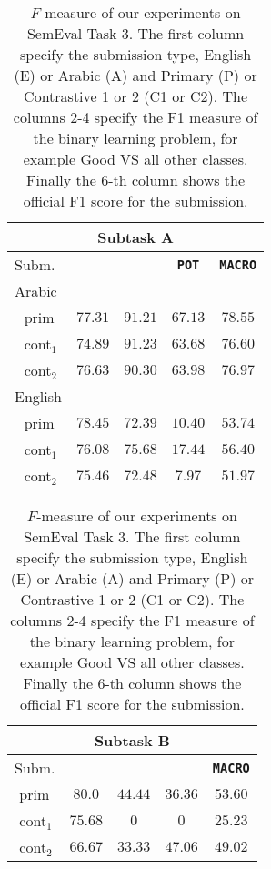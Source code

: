   \begin{table}[h]
 \begin{tabular}{|l|cccc|}
  \multicolumn{5}{c}{Subtask A} \\
  \hline
 Subm.		& \bf \good & \bf\bad 	& \bf \texttt{POT} & \bf\texttt{MACRO}	
 \\
  \hline
  Arabic&&&&\\
  \,\,\,\,prim	& $77.31$ & $91.21$	& $67.13$	& $78.55$ \\
  \,\,\,\,cont$_1$	& $74.89$ & $91.23$	& $63.68$	& $76.60$ \\
  \,\,\,\,cont$_2$	& $76.63$ & $90.30$	& $63.98$	& $76.97$ \\
  
  English \\
  \,\,\,\,prim  & $78.45$	& $72.39$	& $10.40$	& $53.74$ \\
  \,\,\,\,cont$_1$ & $76.08$	& $75.68$	& $17.44$	& $56.40$ \\
  \,\,\,\,cont$_2$ & $75.46$	& $72.48$ 	& $7.97$	& $51.97$ \\
\hline 
\end{tabular}
\begin{tabular}{|l|cccc|}
\hline
  \multicolumn{5}{c}{Subtask B} \\
\hline  
 Subm.		& \bf \yes & \bf \no & \bf \unsure & \bf \texttt{MACRO}	 \\
  \hline
  
  \,\,prim	& $80.0$	& $44.44$	& $36.36$	& $53.60$ \\
  \,\,cont$_1$& $75.68$	& $0$	& $0$	& $25.23$ \\
  \,\,cont$_2$ & $66.67$	& $33.33$ 	& $47.06$	& $49.02$ \\
 \end{tabular}
\caption{$F$-measure of our experiments on SemEval Task 3. The first 
column specify the submission type, English (E) or Arabic (A) and Primary (P) 
or Contrastive 1 or 2 (C1 or C2). The columns 2-4 specify the F1 measure of the 
binary learning problem, for example Good VS all other classes. Finally the 
6-th column shows the official F1 score for the submission.\label{tab:results}}
\end{table}

% 
% 

